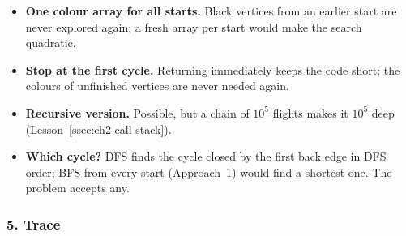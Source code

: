 \begin{tricksbox}
\begin{itemize}[leftmargin=*]
    \item \textbf{One colour array for all starts.} Black vertices from an earlier start are never explored again; a fresh array per start would make the search quadratic.
    \item \textbf{Stop at the first cycle.} Returning immediately keeps the code short; the colours of unfinished vertices are never needed again.
    \item \textbf{Recursive version.} Possible, but a chain of $10^5$ flights makes it $10^5$ deep (Lesson~\ref{ssec:ch2-call-stack}).
    \item \textbf{Which cycle?} DFS finds the cycle closed by the first back edge in DFS order; BFS from every start (Approach~1) would find a shortest one. The problem accepts any.
\end{itemize}
\end{tricksbox}

\subsubsection*{5. Trace}

